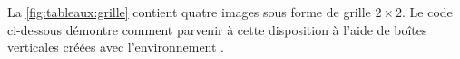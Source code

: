 \begin{exemple}
  \label{exemple:tableaux:grille}
  La \autoref{fig:tableaux:grille} contient quatre images sous forme
  de grille $2 \times 2$. Le code ci-dessous démontre comment parvenir
  à cette disposition à l'aide de boîtes verticales créées avec
  l'environnement .
  \begin{figure}
    \hfill
    \newline
\end{figure}
\end{exemple}
